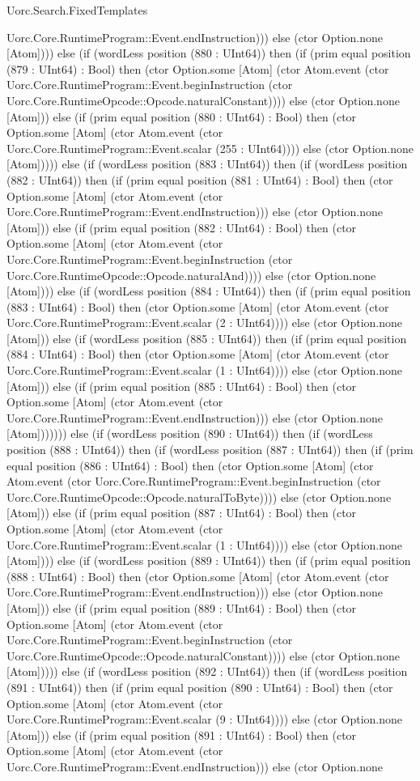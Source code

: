 \begin{lexlean}{Uorc.Search.FixedTemplates}
\begin{semanticmodule}
{Uorc.Core.RuntimeProgram::Event.endInstruction))) else (ctor Option.none [Atom]))) else (if (wordLess position (880 : UInt64)) then (if (prim equal position (879 : UInt64) : Bool) then (ctor Option.some [Atom] (ctor Atom.event (ctor Uorc.Core.RuntimeProgram::Event.beginInstruction (ctor Uorc.Core.RuntimeOpcode::Opcode.naturalConstant)))) else (ctor Option.none [Atom])) else (if (prim equal position (880 : UInt64) : Bool) then (ctor Option.some [Atom] (ctor Atom.event (ctor Uorc.Core.RuntimeProgram::Event.scalar (255 : UInt64)))) else (ctor Option.none [Atom])))) else (if (wordLess position (883 : UInt64)) then (if (wordLess position (882 : UInt64)) then (if (prim equal position (881 : UInt64) : Bool) then (ctor Option.some [Atom] (ctor Atom.event (ctor Uorc.Core.RuntimeProgram::Event.endInstruction))) else (ctor Option.none [Atom])) else (if (prim equal position (882 : UInt64) : Bool) then (ctor Option.some [Atom] (ctor Atom.event (ctor Uorc.Core.RuntimeProgram::Event.beginInstruction (ctor Uorc.Core.RuntimeOpcode::Opcode.naturalAnd)))) else (ctor Option.none [Atom]))) else (if (wordLess position (884 : UInt64)) then (if (prim equal position (883 : UInt64) : Bool) then (ctor Option.some [Atom] (ctor Atom.event (ctor Uorc.Core.RuntimeProgram::Event.scalar (2 : UInt64)))) else (ctor Option.none [Atom])) else (if (wordLess position (885 : UInt64)) then (if (prim equal position (884 : UInt64) : Bool) then (ctor Option.some [Atom] (ctor Atom.event (ctor Uorc.Core.RuntimeProgram::Event.scalar (1 : UInt64)))) else (ctor Option.none [Atom])) else (if (prim equal position (885 : UInt64) : Bool) then (ctor Option.some [Atom] (ctor Atom.event (ctor Uorc.Core.RuntimeProgram::Event.endInstruction))) else (ctor Option.none [Atom])))))) else (if (wordLess position (890 : UInt64)) then (if (wordLess position (888 : UInt64)) then (if (wordLess position (887 : UInt64)) then (if (prim equal position (886 : UInt64) : Bool) then (ctor Option.some [Atom] (ctor Atom.event (ctor Uorc.Core.RuntimeProgram::Event.beginInstruction (ctor Uorc.Core.RuntimeOpcode::Opcode.naturalToByte)))) else (ctor Option.none [Atom])) else (if (prim equal position (887 : UInt64) : Bool) then (ctor Option.some [Atom] (ctor Atom.event (ctor Uorc.Core.RuntimeProgram::Event.scalar (1 : UInt64)))) else (ctor Option.none [Atom]))) else (if (wordLess position (889 : UInt64)) then (if (prim equal position (888 : UInt64) : Bool) then (ctor Option.some [Atom] (ctor Atom.event (ctor Uorc.Core.RuntimeProgram::Event.endInstruction))) else (ctor Option.none [Atom])) else (if (prim equal position (889 : UInt64) : Bool) then (ctor Option.some [Atom] (ctor Atom.event (ctor Uorc.Core.RuntimeProgram::Event.beginInstruction (ctor Uorc.Core.RuntimeOpcode::Opcode.naturalConstant)))) else (ctor Option.none [Atom])))) else (if (wordLess position (892 : UInt64)) then (if (wordLess position (891 : UInt64)) then (if (prim equal position (890 : UInt64) : Bool) then (ctor Option.some [Atom] (ctor Atom.event (ctor Uorc.Core.RuntimeProgram::Event.scalar (9 : UInt64)))) else (ctor Option.none [Atom])) else (if (prim equal position (891 : UInt64) : Bool) then (ctor Option.some [Atom] (ctor Atom.event (ctor Uorc.Core.RuntimeProgram::Event.endInstruction))) else (ctor Option.none }
\end{semanticmodule}
\end{lexlean}
